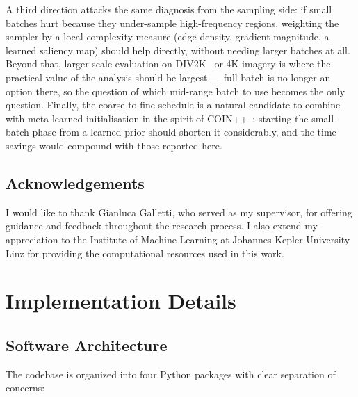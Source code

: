 \documentclass[a4paper,oneside,11pt,english]{scrartcl}
\begin{document}
A third direction attacks the same diagnosis from the sampling side: if
small batches hurt because they under-sample high-frequency regions,
weighting the sampler by a local complexity measure (edge density,
gradient magnitude, a learned saliency map) should help directly,
without needing larger batches at all.  Beyond that, larger-scale
evaluation on DIV2K~\cite{agustsson2017div2k} or 4K imagery is where the
practical value of the analysis should be largest --- full-batch is no
longer an option there, so the question of which mid-range batch to use
becomes the only question.  Finally, the coarse-to-fine schedule is a
natural candidate to combine with meta-learned initialisation in the
spirit of COIN++~\cite{dupont2022coinpp}: starting the small-batch phase
from a learned prior should shorten it considerably, and the time
savings would compound with those reported here.


\subsection*{Acknowledgements}

I would like to thank Gianluca Galletti, who served as my supervisor, for
offering guidance and feedback throughout the research process.  I also extend
my appreciation to the Institute of Machine Learning at Johannes Kepler
University Linz for providing the computational resources used in this work.


\printbibliography


\appendix

\section{Implementation Details}
\label{app:implementation}

\subsection{Software Architecture}

The codebase is organized into four Python packages with clear separation of
concerns:
\end{document}
